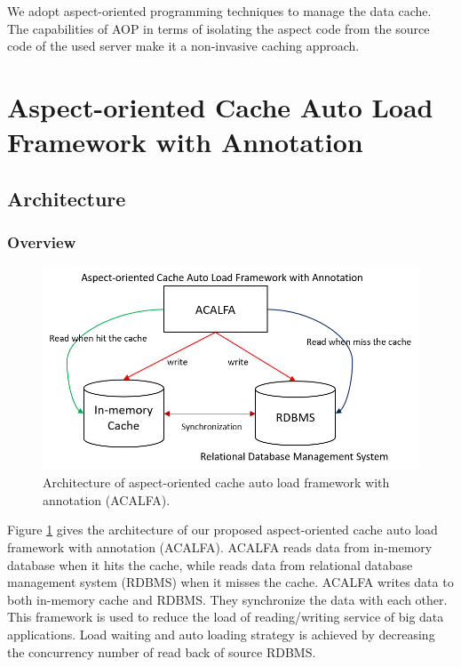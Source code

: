 \documentclass{singlecol-new}
\theoremstyle{TH}{
\newtheorem{lemma}{Lemma}
\newtheorem{theorem}[lemma]{Theorem}
\newtheorem{corrolary}[lemma]{Corrolary}
\newtheorem{conjecture}[lemma]{Conjecture}
\newtheorem{proposition}[lemma]{Proposition}
\newtheorem{claim}[lemma]{Claim}
\newtheorem{stheorem}[lemma]{Wrong Theorem}
}
\theoremstyle{THrm}{
\newtheorem{definition}{Definition}[section]
\newtheorem{question}{Question}[section]
\newtheorem{remark}{Remark}
\newtheorem{scheme}{Scheme}
}
\theoremstyle{THhit}{
\newtheorem{case}{Case}[section]
}
\begin{document}
We adopt aspect-oriented programming techniques to manage the data cache. The capabilities of AOP in terms of isolating the aspect code from the source code of the used server make it a non-invasive caching approach.

\section{Aspect-oriented Cache Auto Load Framework with Annotation}
\label{Framework}

\subsection{Architecture}

\subsubsection{Overview}

\begin{figure} [htb]
\centering
\includegraphics[width=1.0\linewidth]{img/architecture}
\caption{\label{architecture}Architecture of aspect-oriented cache auto load framework with annotation (ACALFA).}
\end{figure}

Figure \ref{architecture} gives the architecture of our proposed aspect-oriented cache auto load framework with annotation (ACALFA). ACALFA reads data from in-memory database when it hits the cache, while reads data from relational database management system (RDBMS) when it misses the cache. ACALFA writes data to both in-memory cache and RDBMS. They synchronize the data with each other. This framework is used to reduce the load of reading/writing service of big data applications. Load waiting and auto loading strategy is achieved by decreasing the concurrency number of read back of source RDBMS.
\end{document}
